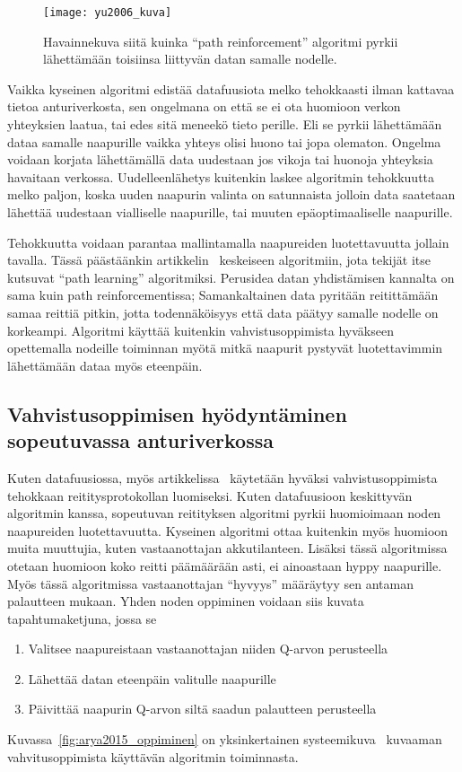 \begin{figure}[h]
  \centering
  \texttt{[image: yu2006\_kuva]}
  \caption{Havainnekuva siitä kuinka ``path reinforcement'' algoritmi pyrkii
    lähettämään toisiinsa liittyvän datan samalle nodelle.~\parencite{Yu2006}}
\label{fig:yu2006}
\end{figure}

Vaikka kyseinen algoritmi edistää datafuusiota melko tehokkaasti ilman kattavaa
tietoa anturiverkosta, sen ongelmana on että se ei ota huomioon verkon
yhteyksien laatua, tai edes sitä meneekö tieto perille. Eli se pyrkii
lähettämään dataa samalle naapurille vaikka yhteys olisi huono tai jopa
olematon. Ongelma voidaan korjata lähettämällä data uudestaan jos vikoja tai
huonoja yhteyksia havaitaan verkossa. Uudelleenlähetys kuitenkin laskee
algoritmin tehokkuutta melko paljon, koska uuden naapurin valinta on
satunnaista jolloin data saatetaan lähettää uudestaan vialliselle naapurille,
tai muuten epäoptimaaliselle naapurille.

Tehokkuutta voidaan parantaa mallintamalla naapureiden luotettavuutta jollain
tavalla. Tässä päästäänkin artikkelin~\cite{Yu2006} keskeiseen algoritmiin,
jota tekijät itse kutsuvat ``path learning'' algoritmiksi. Perusidea datan
yhdistämisen kannalta on sama kuin path reinforcementissa; Samankaltainen data
pyritään reitittämään samaa reittiä pitkin, jotta todennäköisyys että data
päätyy samalle nodelle on korkeampi. Algoritmi käyttää kuitenkin
vahvistusoppimista hyväkseen opettemalla nodeille toiminnan myötä mitkä
naapurit pystyvät luotettavimmin lähettämään dataa myös eteenpäin.


\subsection{Vahvistusoppimisen hyödyntäminen sopeutuvassa anturiverkossa}


Kuten datafuusiossa, myös artikkelissa~\cite{Arya2015} käytetään hyväksi
vahvistusoppimista tehokkaan reititysprotokollan luomiseksi. Kuten datafuusioon
keskittyvän algoritmin kanssa, sopeutuvan reitityksen algoritmi pyrkii
huomioimaan noden naapureiden luotettavuutta. Kyseinen algoritmi ottaa
kuitenkin myös huomioon muita muuttujia, kuten vastaanottajan akkutilanteen.
Lisäksi tässä algoritmissa otetaan huomioon koko reitti päämäärään asti, ei
ainoastaan hyppy naapurille. Myös tässä algoritmissa vastaanottajan ``hyvyys''
määräytyy sen antaman palautteen mukaan. Yhden noden oppiminen voidaan siis
kuvata tapahtumaketjuna, jossa se
\begin{enumerate}
  \item Valitsee naapureistaan vastaanottajan niiden Q-arvon perusteella
  \item Lähettää datan eteenpäin valitulle naapurille
  \item Päivittää naapurin Q-arvon siltä saadun palautteen perusteella
\end{enumerate}
Kuvassa~\ref{fig:arya2015_oppiminen} on yksinkertainen
systeemikuva~\cite{Arya2015} kuvaaman vahvitusoppimista käyttävän algoritmin
toiminnasta.

